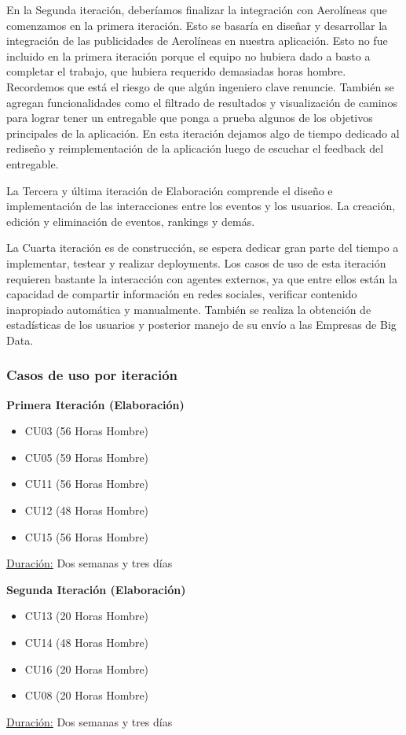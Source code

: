En la Segunda iteración, deberíamos finalizar la integración con Aerolíneas que comenzamos en la primera iteración. Esto se basaría en diseñar y desarrollar la integración de las publicidades de Aerolíneas en nuestra aplicación. Esto no fue incluido en la primera iteración porque el equipo no hubiera dado a basto a completar el trabajo, que hubiera requerido demasiadas horas hombre. Recordemos que está el riesgo de que algún ingeniero clave renuncie. También se agregan funcionalidades como el filtrado de resultados y visualización de caminos para lograr tener un entregable que ponga a prueba algunos de los objetivos principales de la aplicación. En esta iteración dejamos algo de tiempo dedicado al rediseño y reimplementación de la aplicación luego de escuchar el feedback del entregable.

La Tercera y última iteración de Elaboración comprende el diseño e implementación de las interacciones entre los eventos y los usuarios. La creación, edición y eliminación de eventos, rankings y demás.

La Cuarta iteración es de construcción, se espera dedicar gran parte del tiempo a implementar, testear y realizar deployments. Los casos de uso de esta iteración requieren bastante la interacción con agentes externos, ya que entre ellos están la capacidad de compartir información en redes sociales, verificar contenido inapropiado automática y manualmente. También se realiza la obtención de estadísticas de los usuarios y posterior manejo de su envío a las Empresas de Big Data.

\subsubsection{Casos de uso por iteración}
\noindent \textbf{Primera Iteración (Elaboración)}
\begin{itemize}
  \item CU03 (56 Horas Hombre)
  \item CU05 (59 Horas Hombre)
  \item CU11 (56 Horas Hombre)
  \item CU12 (48 Horas Hombre)
  \item CU15 (56 Horas Hombre)
\end{itemize}  
\underline{Duración:} Dos semanas y tres días
\vspace{1.5em}

\noindent \textbf{Segunda Iteración (Elaboración)}
\begin{itemize}
  \item CU13 (20 Horas Hombre)
  \item CU14 (48 Horas Hombre)
  \item CU16 (20 Horas Hombre)
  \item CU08 (20 Horas Hombre)
\end{itemize}
\underline{Duración:} Dos semanas y tres días
\vspace{1.5em}

